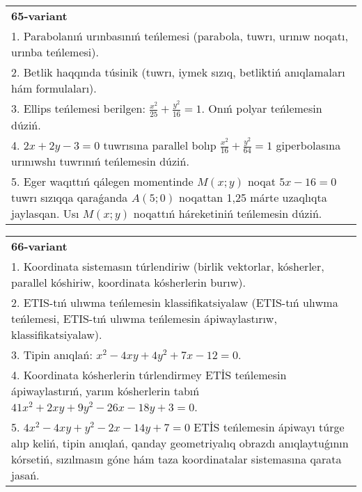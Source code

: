 \documentclass{article}
\begin{document}
\begin{tabular}{m{17cm}}
\textbf{65-variant}\\
1. Parabolanıń urınbasınıń teńlemesi (parabola, tuwrı, urınıw noqatı, urınba teńlemesi).\\

2. Betlik haqqında túsinik (tuwrı, iymek sızıq, betliktiń anıqlamaları hám formulaları).\\

3. Ellips teńlemesi berilgen: $\frac{x^2}{25}+\frac{y^2}{16}=1$. Onıń polyar teńlemesin dúziń.\\

4. $2x + 2y - 3 = 0$ tuwrısına parallel bolıp $\frac{x^{2}}{16} + \frac{y^{2}}{64} = 1$ giperbolasına urınıwshı tuwrınıń teńlemesin dúziń.  \\

5. Eger waqıttıń qálegen momentinde $M(x;y)$ noqat $5x - 16 = 0$ tuwrı sızıqqa qaraǵanda $A(5;0)$ noqattan 1,25 márte uzaqlıqta jaylasqan. Usı $M(x;y)$ noqattıń háreketiniń teńlemesin dúziń.  
\end{tabular}
\vspace{1cm}


\begin{tabular}{m{17cm}}
\textbf{66-variant}\\
1. Koordinata sistemasın túrlendiriw (birlik vektorlar, kósherler, parallel kóshiriw, koordinata kósherlerin burıw).\\

2. ETIS-tıń ulıwma teńlemesin klassifikatsiyalaw (ETIS-tıń ulıwma teńlemesi, ETIS-tıń ulıwma teńlemesin ápiwaylastırıw, klassifikatsiyalaw).\\

3. Tipin anıqlań: $x^{2}-4 xy+4 y^{2}+7 x-12=0$.\\

4. Koordinata kósherlerin túrlendirmey ETİS teńlemesin ápiwaylastırıń, yarım kósherlerin tabıń $41x^{2} + 2xy + 9y^{2} - 26x - 18y + 3 = 0$.  \\

5. $4x^{2} - 4xy + y^{2} - 2x - 14y + 7 = 0$ ETİS teńlemesin ápiwayı túrge alıp keliń, tipin anıqlań, qanday geometriyalıq obrazdı anıqlaytuǵının kórsetiń, sızılmasın góne hám taza koordinatalar sistemasına qarata jasań.  
\end{tabular}
\vspace{1cm}
\end{document}
